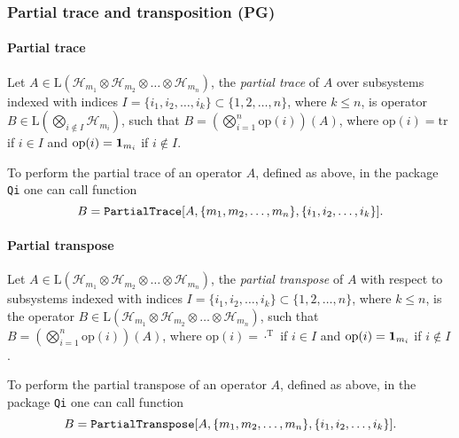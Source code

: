 \documentclass[11pt,a4paper]{article}
\newcommand{\qi}{\texttt{Qi}}
\newcommand{\Hilb}[1]{\mathcal{H}_{#1}}
\newcommand{\Lin}{\mathrm{L}}
\newcommand{\tr}{\mathrm{tr}}
\newcommand{\1}{{\bf 1}}
\newcommand{\fname}[1]{\text{\texttt{#1}}}
\begin{document}
\subsubsection{Partial trace and transposition (PG)}

\paragraph{Partial trace}
Let $A\in \Lin(\Hilb{m_1}\otimes \Hilb{m_2}\otimes \ldots \otimes \Hilb{m_n})$,
the \emph{partial trace} of $A$ over subsystems indexed with indices $I=\{i_1,
i_2, \ldots, i_k\}\subset \{1,2,\ldots, n\}$, where $k\leq n$, is operator $B\in
\Lin(\bigotimes_{i\notin I} \Hilb{m_i})$, such that $B=(\bigotimes_{i=1}^{n}
\mathrm{op}(i))(A)$, where $\mathrm{op}(i)=\tr$ if $i\in I$ and
$\mathrm{op}(i)=\1_{m_i}$ if $i\notin I$.

To perform the partial trace of an operator $A$, defined as above, in the
package \qi{} one can call function
\begin{equation}
B=\fname{PartialTrace}[A, \{m_1, m_2, \ldots, m_n\}, \{i_1, i_2, 
\ldots, i_k\}].
\end{equation} 

\paragraph{Partial transpose}
Let $A\in \Lin(\Hilb{m_1}\otimes \Hilb{m_2}\otimes \ldots \otimes \Hilb{m_n})$,
the \emph{partial transpose} of $A$ with respect to subsystems indexed with
indices $I=\{i_1, i_2, \ldots, i_k\}\subset \{1,2,\ldots, n\}$, where $k\leq n$,
is the operator $B\in \Lin(\Hilb{m_1}\otimes \Hilb{m_2}\otimes \ldots \otimes
\Hilb{m_n})$, such that $B=(\bigotimes_{i=1}^{n} \mathrm{op}(i))(A)$, where
$\mathrm{op}(i)=\cdot^{\mathrm T}$ if $i\in I$ and $\mathrm{op}(i)=\1_{m_i}$ if
$i\notin I$.

To perform the partial transpose of an operator $A$, defined as above, in the
package \qi{} one can call function
\begin{equation}
B=\fname{PartialTranspose}[A, \{m_1, m_2, \ldots, m_n\}, \{i_1, i_2, 
\ldots, i_k\}].
\end{equation} 
\end{document}
